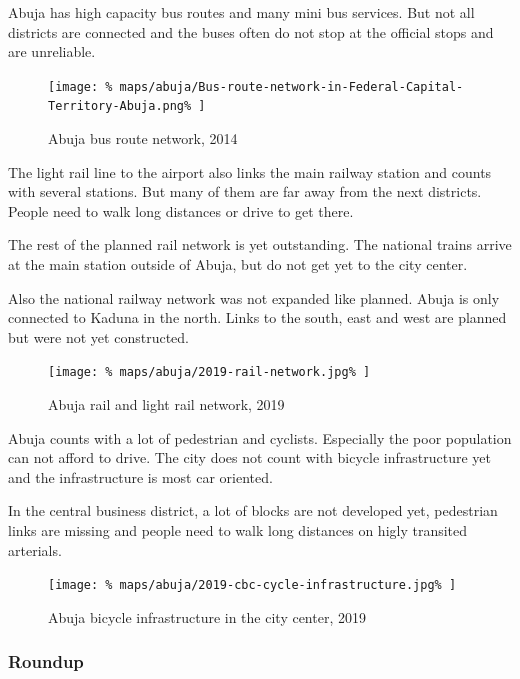 \documentclass[twocolumn]{article}
\begin{document}
			Abuja has high capacity bus routes and many mini bus services. But not all districts are connected and the buses often do not stop at the official stops and are unreliable.
			
			\begin{figure}[H]
				\texttt{[image: \%
					maps/abuja/Bus-route-network-in-Federal-Capital-Territory-Abuja.png\%
				]}
				\caption{Abuja bus route network, 2014\cite{ResearchGate:AbujaBusRouteNetwork}}
				\label{fig:map:abuja-bus-route-network}
			\end{figure}
			
			The light rail line to the airport also links the main railway station and counts with several stations. But many of them are far away from the next districts. People need to walk long distances or drive to get there.
			
			The rest of the planned rail network is yet outstanding. The national trains arrive at the main station outside of Abuja, but do not get yet to the city center.
			
			Also the national railway network was not expanded like planned. Abuja is only connected to Kaduna in the north. Links to the south, east and west are planned but were not yet constructed.
			
			\begin{figure}[H]
				\texttt{[image: \%
					maps/abuja/2019-rail-network.jpg\%
				]}
				\caption{Abuja rail and light rail network, 2019\cite{ResearchGate:AbujaBusRouteNetwork}}
				\label{fig:map:abuja-rail-network-2019}
			\end{figure}
			
			Abuja counts with a lot of pedestrian and cyclists. Especially the poor population can not afford to drive.
			The city does not count with bicycle infrastructure yet and the infrastructure is most car oriented.
			
			In the central business district, a lot of blocks are not developed yet, pedestrian links are missing and people need to walk long distances on higly transited arterials.
			
			\begin{figure}[H]
				\texttt{[image: \%
					maps/abuja/2019-cbc-cycle-infrastructure.jpg\%
				]}
				\caption{Abuja bicycle infrastructure in the city center, 2019\cite{OpenCycleMap:Abuja}}
				\label{fig:map:abuja-bicycle-map-2019}
			\end{figure}	
			
			
			\subsubsection{Roundup}
			
\end{document}
